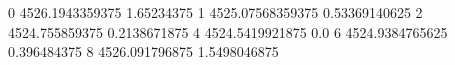 0 4526.1943359375 1.65234375
1 4525.07568359375 0.53369140625
2 4524.755859375 0.2138671875
4 4524.5419921875 0.0
6 4524.9384765625 0.396484375
8 4526.091796875 1.5498046875
